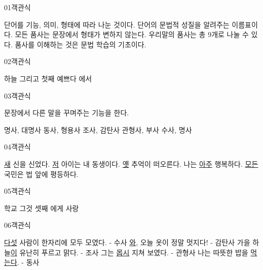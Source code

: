 \documentclass[fs9,seriesRus]{korfarm-base}
\begin{document}
\par\medskip
\kfBeginMC
\begin{kfQBlock}{01}{객관식}
\begin{kfChoices}
\kfChoice 단어를 기능, 의미, 형태에 따라 나눈 것이다.
\kfChoice 단어의 문법적 성질을 알려주는 이름표이다.
\kfChoice 모든 품사는 문장에서 형태가 변하지 않는다.
\kfChoice 우리말의 품사는 총 9개로 나눌 수 있다.
\kfChoice 품사를 이해하는 것은 문법 학습의 기초이다.
\end{kfChoices}
\end{kfQBlock}
\begin{kfQBlock}{02}{객관식}
\begin{kfChoices}
\kfChoice 하늘
\kfChoice 그리고
\kfChoice 첫째
\kfChoice 예쁘다
\kfChoice 에서
\end{kfChoices}
\end{kfQBlock}
\begin{kfQBlock}{03}{객관식}
\begin{kfEvidence}문장에서 다른 말을 꾸며주는 기능을 한다.\end{kfEvidence}
\begin{kfChoices}
\kfChoice 명사, 대명사
\kfChoice 동사, 형용사
\kfChoice 조사, 감탄사
\kfChoice 관형사, 부사
\kfChoice 수사, 명사
\end{kfChoices}
\end{kfQBlock}
\begin{kfQBlock}{04}{객관식}
\begin{kfChoices}
\kfChoice \uline{새} 신을 신었다.
\kfChoice \uline{저} 아이는 내 동생이다.
\kfChoice \uline{옛} 추억이 떠오른다.
\kfChoice 나는 \uline{아주} 행복하다.
\kfChoice \uline{모든} 국민은 법 앞에 평등하다.
\end{kfChoices}
\end{kfQBlock}
\begin{kfQBlock}{05}{객관식}
\begin{kfChoices}
\kfChoice 학교
\kfChoice 그것
\kfChoice 셋째
\kfChoice 에게
\kfChoice 사랑
\end{kfChoices}
\end{kfQBlock}
\begin{kfQBlock}{06}{객관식}
\begin{kfChoices}
\kfChoice \uline{다섯} 사람이 한자리에 모두 모였다. - 수사
\kfChoice \uline{와}, 오늘 옷이 정말 멋지다! - 감탄사
\kfChoice 가을 하늘\uline{이} 유난히 푸르고 맑다. - 조사
\kfChoice 그는 \uline{몹시} 지쳐 보였다. - 관형사
\kfChoice 나는 따뜻한 밥을 \uline{먹는다}. - 동사
\end{kfChoices}
\end{kfQBlock}
\end{document}

